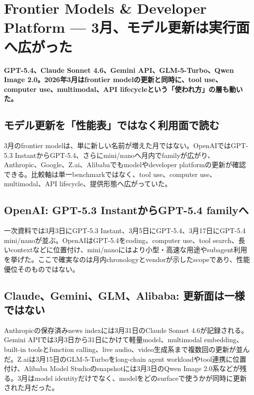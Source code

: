 \section{Frontier Models \& Developer Platform — 3月、モデル更新は実行面へ広がった}
\label{pkg:frontier-models-platform-march}
\noindent\textbf{GPT-5.4、Claude Sonnet 4.6、Gemini API、GLM-5-Turbo、Qwen Image 2.0。2026年3月はfrontier modelの更新と同時に、tool use、computer use、multimodal、API lifecycleという「使われ方」の層も動いた。}\autocite{src-9156c37fb1c2,src-a24fd97eb3d0,src-eac8dfbeb78c,src-eea6230f612a,src-f6aa679babd7}

\subsection{モデル更新を「性能表」ではなく利用面で読む}

3月のfrontier modelは、単に新しい名前が増えた月ではない。OpenAIではGPT-5.3 InstantからGPT-5.4、さらにmini/nanoへ月内でfamilyが広がり、Anthropic、Google、Z.ai、Alibabaでもmodelやdeveloper platformの更新が確認できる。比較軸は単一benchmarkではなく、tool use、computer use、multimodal、API lifecycle、提供形態へ広がっていた。\autocite{src-46b3e364b737,src-8afdb503cc56,src-9156c37fb1c2,src-a24fd97eb3d0,src-eac8dfbeb78c,src-eea6230f612a,src-f6aa679babd7}


\subsection{OpenAI: GPT-5.3 InstantからGPT-5.4 familyへ}

一次資料では3月3日にGPT-5.3 Instant、3月5日にGPT-5.4、3月17日にGPT-5.4 mini/nanoが並ぶ。OpenAIはGPT-5.4をcoding、computer use、tool search、長いcontextなどに位置付け、mini/nanoにはより小型・高速な用途やsubagent利用を挙げた。ここで確実なのは月内chronologyとvendorが示したscopeであり、性能優位そのものではない。\autocite{src-46b3e364b737,src-8afdb503cc56,src-eea6230f612a}


\subsection{Claude、Gemini、GLM、Alibaba: 更新面は一様ではない}

Anthropicの保存済みnews indexには3月31日のClaude Sonnet 4.6が記録される。Gemini APIでは3月3日から31日にかけて軽量model、multimodal embedding、built-in toolsとfunction calling、live audio、video生成系まで複数回の更新が並んだ。Z.aiは3月15日のGLM-5-Turboをlong-chain agent workloadやtool連携に位置付け、Alibaba Model Studioのsnapshotには3月3日のQwen Image 2.0系などが残る。3月はmodel identityだけでなく、modelをどのsurfaceで使うかが同時に更新された月だった。\autocite{src-9156c37fb1c2,src-a24fd97eb3d0,src-eac8dfbeb78c,src-f6aa679babd7}


